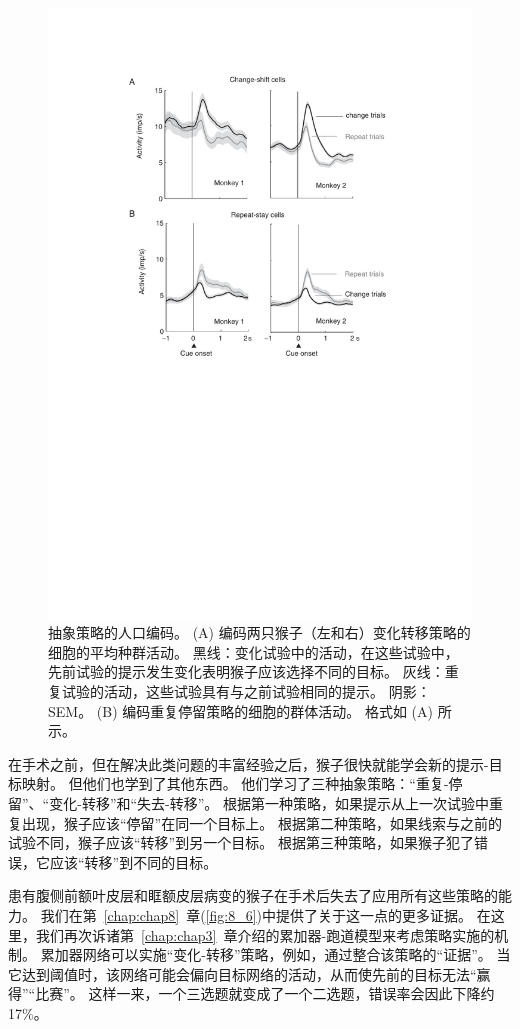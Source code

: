  \begin{figure}
	\centering
	\includegraphics[width=0.6\linewidth]{chap7/7_11}
	\caption{抽象策略的人口编码。
		 (A) 编码两只猴子（左和右）变化转移策略的细胞的平均种群活动。
		 黑线：变化试验中的活动，在这些试验中，先前试验的提示发生变化表明猴子应该选择不同的目标。
		 灰线：重复试验的活动，这些试验具有与之前试验相同的提示。
		 阴影：SEM。
		 (B) 编码重复停留策略的细胞的群体活动。
		 格式如 (A) 所示\cite{genovesio2007neurophysiology}。\label{fig:7_11}}
\end{figure}
\par


在手术之前，但在解决此类问题的丰富经验之后，猴子很快就能学会新的提示-目标映射。
但他们也学到了其他东西。 他们学习了三种抽象策略：“重复-停留”、“变化-转移”和“失去-转移”。
根据第一种策略，如果提示从上一次试验中重复出现，猴子应该“停留”在同一个目标上。
根据第二种策略，如果线索与之前的试验不同，猴子应该“转移”到另一个目标。
根据第三种策略，如果猴子犯了错误，它应该“转移”到不同的目标。
\par


患有腹侧前额叶皮层和眶额皮层病变的猴子在手术后失去了应用所有这些策略的能力\cite{bussey2001role}。
我们在第~\ref{chap:chap8}~章(\ref{fig:8_6})中提供了关于这一点的更多证据。
在这里，我们再次诉诸第~\ref{chap:chap3}~章介绍的累加器-跑道模型来考虑策略实施的机制。 
累加器网络可以实施“变化-转移”策略，例如，通过整合该策略的“证据”。
当它达到阈值时，该网络可能会偏向目标网络的活动，从而使先前的目标无法“赢得”“比赛”。
这样一来，一个三选题就变成了一个二选题，错误率会因此下降约 17\%。
\par


